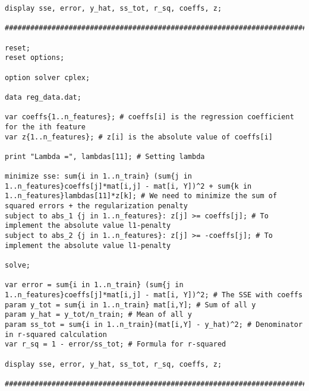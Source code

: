 \documentclass[15pt,a4paper,openright]{article}
\begin{document}
\begin{lstlisting}[language=AMPL, caption=1c Code]
display sse, error, y_hat, ss_tot, r_sq, coeffs, z;

#############################################################################

reset;
reset options;

option solver cplex;

data reg_data.dat;

var coeffs{1..n_features}; # coeffs[i] is the regression coefficient for the ith feature
var z{1..n_features}; # z[i] is the absolute value of coeffs[i]

print "Lambda =", lambdas[11]; # Setting lambda

minimize sse: sum{i in 1..n_train} (sum{j in 1..n_features}coeffs[j]*mat[i,j] - mat[i, Y])^2 + sum{k in 1..n_features}lambdas[11]*z[k]; # We need to minimize the sum of squared errors + the regularization penalty
subject to abs_1 {j in 1..n_features}: z[j] >= coeffs[j]; # To implement the absolute value l1-penalty
subject to abs_2 {j in 1..n_features}: z[j] >= -coeffs[j]; # To implement the absolute value l1-penalty

solve;

var error = sum{i in 1..n_train} (sum{j in 1..n_features}coeffs[j]*mat[i,j] - mat[i, Y])^2; # The SSE with coeffs
param y_tot = sum{i in 1..n_train} mat[i,Y]; # Sum of all y
param y_hat = y_tot/n_train; # Mean of all y
param ss_tot = sum{i in 1..n_train}(mat[i,Y] - y_hat)^2; # Denominator in r-squared calculation
var r_sq = 1 - error/ss_tot; # Formula for r-squared

display sse, error, y_hat, ss_tot, r_sq, coeffs, z;

#############################################################################

\end{lstlisting}
\end{document}
